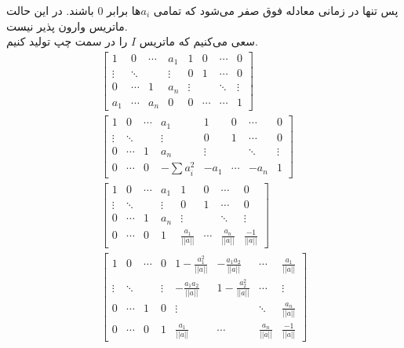 پس تنها در زمانی معادله فوق صفر می‌شود که تمامی
$a_i$ها
برابر 0 باشند. در این حالت ماتریس وارون پذیر نیست.
\\
سعی می‌کنیم که ماتریس
$I$
را در سمت چپ تولید کنیم.
\begin{gather*}
    \left[
        \begin{array}{cccc|cccc}
            1 & 0 & \cdots & a_1 & 1 & 0 & \cdots & 0\\
            \vdots & \ddots &  & \vdots & 0 & 1 & \cdots & 0\\
            0 & \cdots & 1 & a_n & \vdots &  & \ddots & \vdots\\
            a_1 & \cdots & a_n & 0 & 0 & \cdots & \cdots & 1
        \end{array}
    \right]
    \\
    \left[
        \begin{array}{cccc|cccc}
            1 & 0 & \cdots & a_1 & 1 & 0 & \cdots & 0\\
            \vdots & \ddots &  & \vdots & 0 & 1 & \cdots & 0\\
            0 & \cdots & 1 & a_n & \vdots &  & \ddots & \vdots\\
            0 & \cdots & 0 & -\sum a_i^2 & -a_1 & \cdots & -a_n & 1 
        \end{array}
    \right]
    \\
    \left[
        \begin{array}{cccc|cccc}
            1 & 0 & \cdots & a_1 & 1 & 0 & \cdots & 0\\
            \vdots & \ddots &  & \vdots & 0 & 1 & \cdots & 0\\
            0 & \cdots & 1 & a_n & \vdots &  & \ddots & \vdots\\
            0 & \cdots & 0 & 1 & \frac{a_1}{||a||} & \cdots & \frac{a_n}{||a||} & \frac{-1}{||a||} 
        \end{array}
    \right]
    \\
    \left[
        \begin{array}{cccc|cccc}
            1 & 0 & \cdots & 0 & 1 -\frac{a_1^2}{||a||} & -\frac{a_1 a_2}{||a||} & \cdots & \frac{a_1}{||a||}\\
            \vdots & \ddots &  & \vdots & -\frac{a_1 a_2}{||a||} & 1 -\frac{a_2^2}{||a||} & \cdots & \vdots\\
            0 & \cdots & 1 & 0 & \vdots &  & \ddots & \frac{a_n}{||a||}\\
            0 & \cdots & 0 & 1 & \frac{a_1}{||a||} & \cdots & \frac{a_n}{||a||} & \frac{-1}{||a||} 
        \end{array}
    \right]
\end{gather*}



